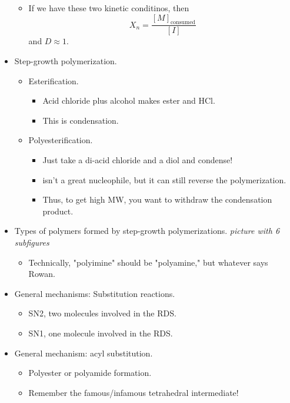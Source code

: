 \documentclass[../notes.tex]{subfiles}
\begin{document}
\begin{itemize}
\begin{itemize}
        \item If we have these two kinetic conditinos, then
        \begin{equation*}
            X_n = \frac{[M]_\text{consumed}}{[I]}
        \end{equation*}
        and $D\approx 1$.
    \end{itemize}
    \item Step-growth polymerization.
    \begin{itemize}
        \item Esterification.
        \begin{itemize}
            \item Acid chloride plus alcohol makes ester and HCl.
            \item This is condensation.
        \end{itemize}
        \item Polyesterification.
        \begin{itemize}
            \item Just take a di-acid chloride and a diol and condense!
            \item {} isn't a great nucleophile, but it can still reverse the polymerization.
            \item Thus, to get high MW, you want to withdraw the condensation product.
        \end{itemize}
    \end{itemize}
    \item Types of polymers formed by step-growth polymerizations.
    \emph{picture with 6 subfigures}
    \begin{itemize}
        \item Technically, "polyimine" should be "polyamine," but whatever says Rowan.
    \end{itemize}
    \item General mechanisms: Substitution reactions.
    \begin{itemize}
        \item SN2, two molecules involved in the RDS.
        \item SN1, one molecule involved in the RDS.
    \end{itemize}
    \item General mechanism: acyl substitution.
    \begin{itemize}
        \item Polyester or polyamide formation.
        \item Remember the famous/infamous tetrahedral intermediate!

\end{itemize}
\end{itemize}
\end{document}
